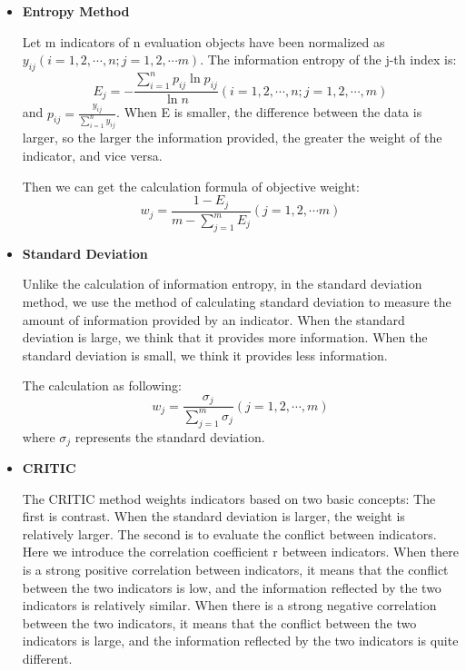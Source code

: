 \documentclass[12pt]{article}  %
\begin{document}
\begin{itemize}
	\item \textbf{Entropy Method}
	
	Let m indicators of n evaluation objects have been normalized as $y_{ij} \left( {i = 1,2, \cdots ,n;j = 1,2, \cdots m} \right)$. The information entropy of the j-th index is:
	\begin{equation}
	{E_j} =  - \frac{{\sum\limits_{i = 1}^n {{p_{ij}}\ln {p_{ij}}} }}{{\ln n}}\left( {i = 1,2, \cdots ,n;j = 1,2, \cdots ,m} \right)
	\end{equation}
	and ${p_{ij}} = \frac{{{y_{ij}}}}{{\sum\limits_{i = 1}^n {{y_{ij}}} }}$.
	When E is smaller, the difference between the data is larger, so the larger the information provided, the greater the weight of the indicator, and vice versa.
	
	Then we can get the calculation formula of objective weight:
	\begin{equation}
	{w_j} = \frac{{1 - {E_j}}}{{m - \sum\limits_{j = 1}^m {{E_j}} }}(j = 1,2, \cdots m)
	\end{equation}
	
	\item \textbf{Standard Deviation}
	
	Unlike the calculation of information entropy, in the standard deviation method, we use the method of calculating standard deviation to measure the amount of information provided by an indicator. When the standard deviation is large, we think that it provides more information. When the standard deviation is small, we think it provides less information.
	
	The calculation as following:
	\begin{equation}
	{w_j} = \frac{{{\sigma _j}}}{{\sum\limits_{j = 1}^m {{\sigma _j}} }}(j = 1,2, \cdots ,m)
	\end{equation}
	where $\sigma _j$ represents the standard deviation.
	
	\item \textbf{CRITIC}
	
	The CRITIC method weights indicators based on two basic concepts: The first is contrast. When the standard deviation is larger, the weight is relatively larger. The second is to evaluate the conflict between indicators. Here we introduce the correlation coefficient r between indicators. When there is a strong positive correlation between indicators, it means that the conflict between the two indicators is low, and the information reflected by the two indicators is relatively similar. When there is a strong negative correlation between the two indicators, it means that the conflict between the two indicators is large, and the information reflected by the two indicators is quite different.
	

\end{itemize}
\end{document}
